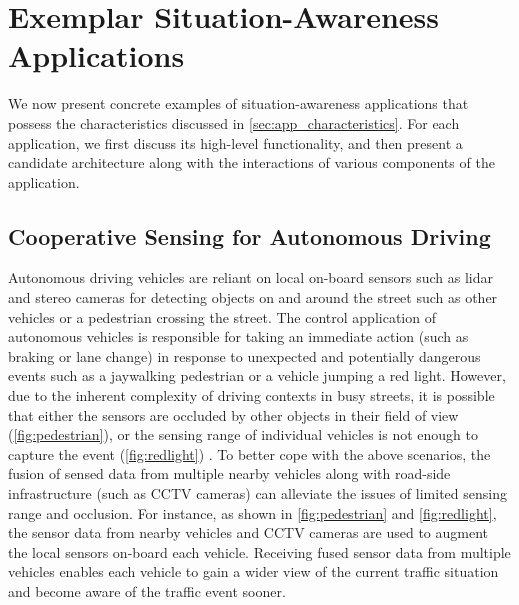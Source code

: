 \section{Exemplar Situation-Awareness Applications}
We now present concrete examples of situation-awareness applications that possess the characteristics discussed in \cref{sec:app_characteristics}. For each application, we first discuss its high-level functionality, and then present a candidate architecture along with the interactions of various components of the application. 
\subsection{Cooperative Sensing for Autonomous Driving}
Autonomous driving vehicles are reliant on local on-board sensors such as \gls{lidar} and stereo cameras for detecting objects on and around the street such as other vehicles or a pedestrian crossing the street. The control application of autonomous vehicles is responsible for taking an immediate action (such as braking or lane change) in response to unexpected and potentially dangerous events such as a jaywalking pedestrian or a vehicle jumping a red light. However, due to the inherent complexity of driving contexts in busy streets, it is possible that either the sensors are occluded by other objects in their field of view (\cref{fig:pedestrian}), or the sensing range of individual vehicles is not enough to capture the event (\cref{fig:redlight}) \cite{fusioneye}. To better cope with the above scenarios, the fusion of sensed data from multiple nearby vehicles along with road-side infrastructure (such as CCTV cameras) can alleviate the issues of limited sensing range and occlusion. For instance, as shown in \cref{fig:pedestrian} and \cref{fig:redlight}, the sensor data from nearby vehicles and CCTV cameras are used to augment the local sensors on-board each vehicle. Receiving fused sensor data from multiple vehicles enables each vehicle to gain a wider view of the current traffic situation and become aware of the traffic event sooner.

